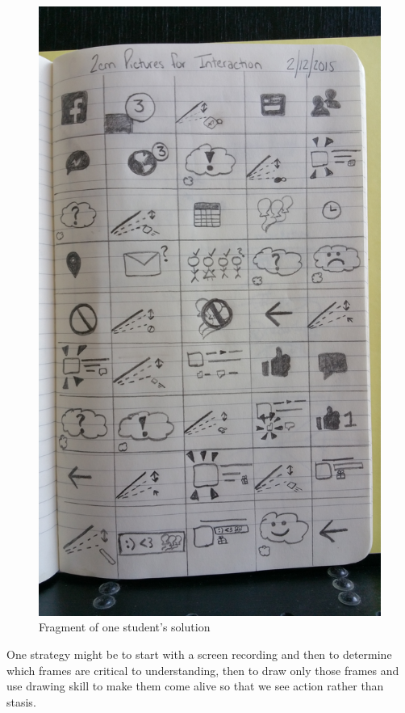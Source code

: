 \begin{figure}
\centering
\includegraphics{./fiRecordInteract.jpg}
\caption{Fragment of one student's solution}
\end{figure}

One strategy might be to start with a screen recording and then to
determine which frames are critical to understanding, then to draw only
those frames and use drawing skill to make them come alive so that we
see action rather than stasis.

